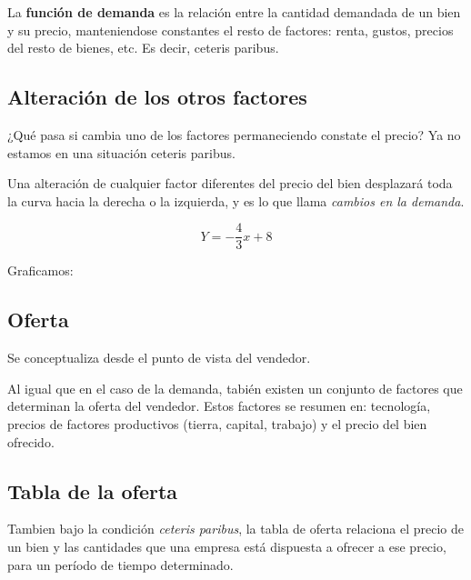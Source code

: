 La \textbf{función de demanda} es la relación entre la cantidad demandada de un bien y su precio,
manteniendose constantes el resto de factores: renta, gustos, precios del resto de bienes, etc.
Es decir,
ceteris paribus.

\subsection{Alteración de los otros factores}

¿Qué pasa si cambia uno de los factores permaneciendo constate el precio?
Ya no estamos en una situación ceteris paribus.

Una alteración de cualquier factor diferentes del precio del bien
desplazará toda la curva hacia la derecha o la izquierda,
y es lo que llama \textit{cambios en la demanda}.

\begin{equation*}
    Y = -\frac{4}{3}x + 8
\end{equation*}

Graficamos:

\begin{center}
\end{center}

\subsection{Oferta}

Se conceptualiza desde el punto de vista del vendedor.

Al igual que en el caso de la demanda,
tabién existen un conjunto de factores que determinan la oferta del vendedor.
Estos factores se resumen en: 
tecnología, 
precios de factores productivos 
(tierra, capital, trabajo)
y el precio del bien ofrecido.

\subsection{Tabla de la oferta}

Tambien bajo la condición \textit{ceteris paribus},
la tabla de oferta relaciona el precio de un bien y las cantidades que una empresa está dispuesta a ofrecer a ese precio,
para un período de tiempo determinado.

